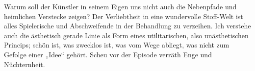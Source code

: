 Warum soll der Künstler in seinem Eigen uns nicht auch die Nebenpfade und heimlichen Verstecke zeigen? Der Verliebtheit in eine wundervolle Stoff-Welt ist alles Spielerische und Abschweifende in der Behandlung zu verzeihen. Ich verstehe auch die ästhetisch gerade Linie als Form eines utilitarischen, also unästhetischen Princips; schön ist, was zwecklos ist, was vom Wege abliegt, was nicht zum Gefolge einer „Idee“ gehört. Scheu vor der Episode verräth Enge und Nüchternheit.
\par

